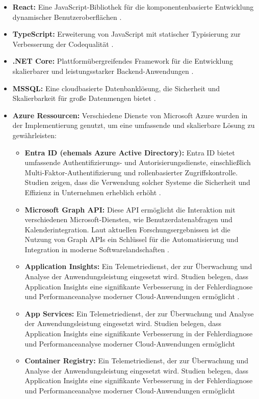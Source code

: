 \begin{itemize}
    \item \textbf{React:} Eine JavaScript-Bibliothek für die komponentenbasierte Entwicklung dynamischer Benutzeroberflächen \cite{stefanov2021react}.
    \item \textbf{TypeScript:} Erweiterung von JavaScript mit statischer Typisierung zur Verbesserung der Codequalität \cite{typeScriptDocumentation}.
    \item \textbf{.NET Core:} Plattformübergreifendes Framework für die Entwicklung skalierbarer und leistungsstarker Backend-Anwendungen \cite{microsoftDotNet}.
    \item \textbf{MSSQL:} Eine cloudbasierte Datenbanklösung, die Sicherheit und Skalierbarkeit für große Datenmengen bietet \cite{azureDocumentation}.
    \item \textbf{Azure Ressourcen:} Verschiedene Dienste von Microsoft Azure wurden in der Implementierung genutzt, um eine umfassende und skalierbare Lösung zu gewährleisten:
    \begin{itemize}
       \item \textbf{Entra ID (ehemals Azure Active Directory):} Entra ID bietet umfassende Authentifizierungs- und Autorisierungsdienste, einschließlich Multi-Faktor-Authentifizierung und rollenbasierter Zugriffskontrolle. Studien zeigen, dass die Verwendung solcher Systeme die Sicherheit und Effizienz in Unternehmen erheblich erhöht \cite{microsoftEntraID, woods2020authentication}.
\item \textbf{Microsoft Graph API:} Diese API ermöglicht die Interaktion mit verschiedenen Microsoft-Diensten, wie Benutzerdatenabfragen und Kalenderintegration. Laut aktuellen Forschungsergebnissen ist die Nutzung von Graph APIs ein Schlüssel für die Automatisierung und Integration in moderne Softwarelandschaften \cite{microsoftGraphAPI, smith2021graph}.
\item \textbf{Application Insights:} Ein Telemetriedienst, der zur Überwachung und Analyse der Anwendungsleistung eingesetzt wird. Studien belegen, dass Application Insights eine signifikante Verbesserung in der Fehlerdiagnose und Performanceanalyse moderner Cloud-Anwendungen ermöglicht \cite{microsoftAppInsights, li2021monitoring}.
\item \textbf{App Services:} Ein Telemetriedienst, der zur Überwachung und Analyse der Anwendungsleistung eingesetzt wird. Studien belegen, dass Application Insights eine signifikante Verbesserung in der Fehlerdiagnose und Performanceanalyse moderner Cloud-Anwendungen ermöglicht 
\item \textbf{Container Registry:} Ein Telemetriedienst, der zur Überwachung und Analyse der Anwendungsleistung eingesetzt wird. Studien belegen, dass Application Insights eine signifikante Verbesserung in der Fehlerdiagnose und Performanceanalyse moderner Cloud-Anwendungen ermöglicht 


\end{itemize}
\end{itemize}
